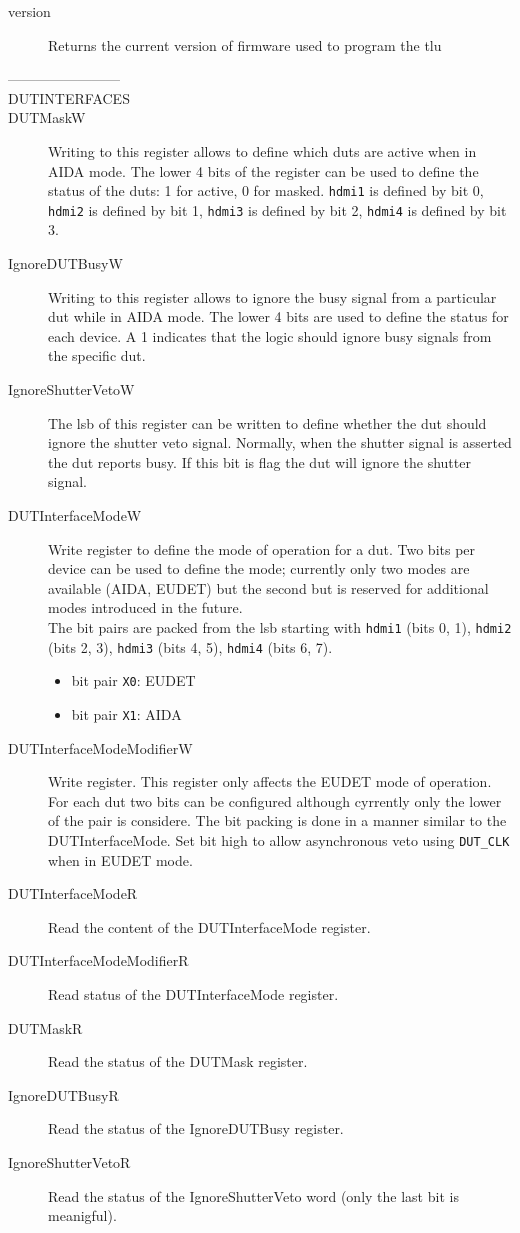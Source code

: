 \begin{description}\label{ch:IPBus_DUT}
  \item[version] Returns the current version of firmware used to program the \gls{tlu}
  \item[------------------------]
  \item[DUTINTERFACES]
  \item[DUTMaskW] Writing to this register allows to define which \gls{dut}s are active when in AIDA mode. The lower 4 bits of the register can be used to define the status of the \gls{dut}s: 1 for active, 0 for masked. \verb|hdmi1| is defined by bit 0, \verb|hdmi2| is defined by bit 1, \verb|hdmi3| is defined by bit 2, \verb|hdmi4| is defined by bit 3.
  \item[IgnoreDUTBusyW] Writing to this register allows to ignore the busy signal from a particular \gls{dut} while in AIDA mode. The lower 4 bits are used to define the status for each device. A 1 indicates that the logic should ignore busy signals from the specific \gls{dut}.
  \item[IgnoreShutterVetoW] The \gls{lsb} of this register can be written to define whether the \gls{dut} should ignore the shutter veto signal. Normally, when the shutter signal is asserted the \gls{dut} reports busy. If this bit is flag the \gls{dut} will ignore the shutter signal.
  \item[DUTInterfaceModeW] Write register to define the mode of operation for a \gls{dut}. Two bits per device can be used to define the mode; currently only two modes are available (AIDA, EUDET) but the second but is reserved for additional modes introduced in the future.\\
      The bit pairs are packed from the \gls{lsb} starting with \verb|hdmi1| (bits 0, 1), \verb|hdmi2| (bits 2, 3), \verb|hdmi3| (bits 4, 5),  \verb|hdmi4| (bits 6, 7).
      \begin{itemize}
        \item bit pair \texttt{X0}: EUDET
        \item bit pair \texttt{X1}: AIDA
      \end{itemize}
  \item[DUTInterfaceModeModifierW] Write register. This register only affects the EUDET mode of operation. For each \gls{dut} two bits can be configured although cyrrently only the lower of the pair is considere. The bit packing is done in a manner similar to the DUTInterfaceMode. Set bit high to allow asynchronous veto using \verb|DUT_CLK| when in EUDET mode.
  \item[DUTInterfaceModeR] Read the content of the DUTInterfaceMode register.
  \item[DUTInterfaceModeModifierR] Read status of the DUTInterfaceMode register.
  \item[DUTMaskR] Read the status of the DUTMask register.
  \item[IgnoreDUTBusyR] Read the status of the IgnoreDUTBusy register.
  \item[IgnoreShutterVetoR] Read the status of the IgnoreShutterVeto word (only the last bit is meanigful).
\end{description}

